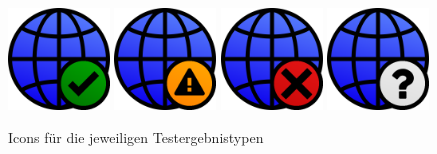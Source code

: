 \begin{figure}[H]
	\includegraphics[width=0.24\textwidth]{images/webifier-clean}
	\includegraphics[width=0.24\textwidth]{images/webifier-suspicious}
	\includegraphics[width=0.24\textwidth]{images/webifier-malicious}
	\includegraphics[width=0.24\textwidth]{images/webifier-undefined}
	\label{fig:resultIcons}
	\caption{Icons für die jeweiligen Testergebnistypen}
\end{figure}

